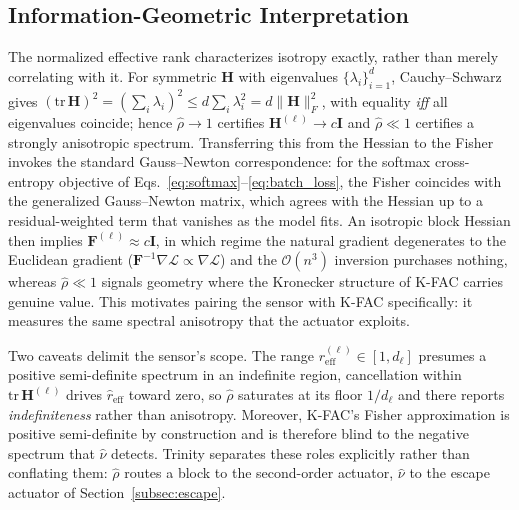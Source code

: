 \documentclass[conference]{IEEEtran}
\begin{document}
\subsection{Information-Geometric Interpretation}
\label{subsec:info_geom}
The normalized effective rank characterizes isotropy exactly, rather than merely correlating with it. For symmetric $\mathbf{H}$ with eigenvalues $\{\lambda_i\}_{i=1}^{d}$, Cauchy--Schwarz gives $(\mathrm{tr}\,\mathbf{H})^2 = (\sum_i \lambda_i)^2 \le d \sum_i \lambda_i^2 = d\|\mathbf{H}\|_F^2$, with equality \emph{iff} all eigenvalues coincide; hence $\hat{\rho} \to 1$ certifies $\mathbf{H}^{(\ell)} \to c\mathbf{I}$ and $\hat{\rho} \ll 1$ certifies a strongly anisotropic spectrum. Transferring this from the Hessian to the Fisher invokes the standard Gauss--Newton correspondence: for the softmax cross-entropy objective of Eqs.~\eqref{eq:softmax}--\eqref{eq:batch_loss}, the Fisher coincides with the generalized Gauss--Newton matrix, which agrees with the Hessian up to a residual-weighted term that vanishes as the model fits. An isotropic block Hessian then implies $\mathbf{F}^{(\ell)} \approx c\mathbf{I}$, in which regime the natural gradient degenerates to the Euclidean gradient ($\mathbf{F}^{-1}\nabla \mathcal{L} \propto \nabla \mathcal{L}$) and the $\mathcal{O}(n^3)$ inversion purchases nothing, whereas $\hat{\rho} \ll 1$ signals geometry where the Kronecker structure of K-FAC carries genuine value. This motivates pairing the sensor with K-FAC specifically: it measures the same spectral anisotropy that the actuator exploits.

Two caveats delimit the sensor's scope. The range $r^{(\ell)}_{\mathrm{eff}} \in [1, d_\ell]$ presumes a positive semi-definite spectrum in an indefinite region, cancellation within $\mathrm{tr}\,\mathbf{H}^{(\ell)}$ drives $\hat{r}_{\mathrm{eff}}$ toward zero, so $\hat{\rho}$ saturates at its floor $1/d_\ell$ and there reports \emph{indefiniteness} rather than anisotropy. Moreover, K-FAC's Fisher approximation is positive semi-definite by construction and is therefore blind to the negative spectrum that $\hat{\nu}$ detects. Trinity separates these roles explicitly rather than conflating them: $\hat{\rho}$ routes a block to the second-order actuator, $\hat{\nu}$ to the escape actuator of Section~\ref{subsec:escape}.
\end{document}
